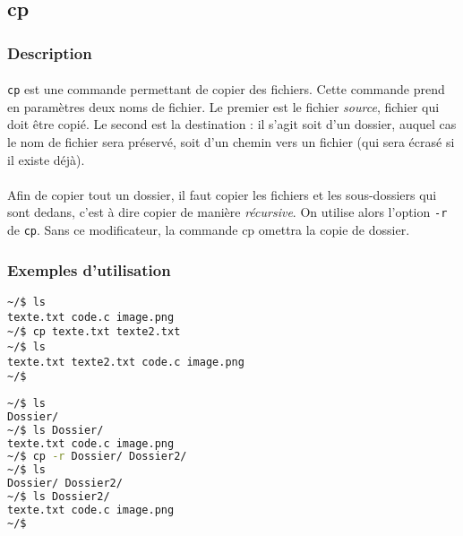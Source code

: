 \subsection{cp}

\subsubsection*{Description}

\paragraph{} \texttt{cp} est une commande permettant de copier des fichiers.
Cette commande prend en paramètres deux noms de fichier. Le premier est le
fichier \emph{source}, fichier qui doit être copié. Le second est la
destination : il s'agit soit d'un dossier, auquel cas le nom de fichier sera
préservé, soit d'un chemin vers un fichier (qui sera écrasé si il existe
déjà).

\paragraph{} Afin de copier tout un dossier, il faut copier les fichiers et les
sous-dossiers qui sont dedans, c'est à dire copier de manière \emph{récursive}.
On utilise alors l'option \texttt{-r} de \texttt{cp}. Sans ce modificateur, la
commande cp omettra la copie de dossier.

\subsubsection*{Exemples d'utilisation}

\begin{lstlisting}[caption=copie de fichier]
~/$ ls
texte.txt code.c image.png
~/$ cp texte.txt texte2.txt
~/$ ls
texte.txt texte2.txt code.c image.png
~/$
\end{lstlisting}

\begin{lstlisting}[language=bash,caption=copie de dossier]
~/$ ls
Dossier/
~/$ ls Dossier/
texte.txt code.c image.png
~/$ cp -r Dossier/ Dossier2/
~/$ ls
Dossier/ Dossier2/
~/$ ls Dossier2/
texte.txt code.c image.png
~/$
\end{lstlisting}
